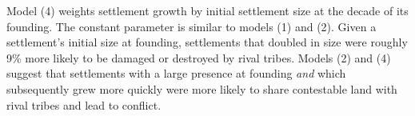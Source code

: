 \documentclass[11pt]{article}
\begin{document}
\noindent{}

\pagebreak

Model (4) weights settlement growth by initial settlement size at the decade of its founding. The constant parameter is similar to models (1) and (2). Given a settlement's initial size at founding, settlements that doubled in size were roughly 9\% more likely to be damaged or destroyed by rival tribes. Models (2) and (4) suggest that settlements with a large presence at founding {\em and} which subsequently grew more quickly were more likely to share contestable land with rival tribes and lead to conflict.



\end{document}
